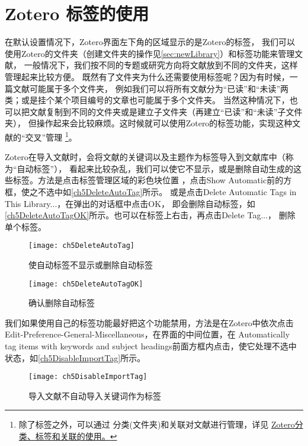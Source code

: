 \documentclass[cn,11pt,chinese]{elegantbook}
\begin{document}
	\section{Zotero 标签的使用} \label{sec:tag}
			在默认设置情况下，Zotero界面左下角的区域显示的是Zotero的标签，
			我们可以使用Zotero的文件夹（创建文件夹的操作见\cref{sec:newLibrary}）和标签功能来管理文献，
			一般情况下，我们按不同的专题或研究方向将文献放到不同的文件夹，这样管理起来比较方便。
			既然有了文件夹为什么还需要使用标签呢？因为有时候，一篇文献可能属于多个文件夹，
			例如我们可以将所有文献分为“已读”和“未读”两类；或是挂个某个项目编号的文章也可能属于多个文件夹。
			当然这种情况下，也可以把文献复制到不同的文件夹或是建立子文件夹（再建立“已读”和“未读”子文件夹），
			但操作起来会比较麻烦。这时候就可以使用Zotero的标签功能，实现这种文献的“交叉”管理
			\footnote{除了标签之外，可以通过
		分类(文件夹)和关联对文献进行管理，详见
		\href{https://zhuanlan.zhihu.com/p/275707703}{Zotero分类、标签和关联的使用。}}。
			
			Zotero在导入文献时，会将文献的关键词以及主题作为标签导入到文献库中（称为“自动标签”），
			看起来比较杂乱，我们可以使它不显示，或是删除自动生成的这些标签。方法是点击标签管理区域的彩色块位置
			，点击Show Automatic前的方框，使之不选中如\autoref{ch5DeleteAutoTag}所示。
			或是点击Delete Automatic Tags in This Library...，在弹出的对话框中点击OK，
			即会删除自动标签，如\autoref{ch5DeleteAutoTagOK}所示。也可以在标签上右击，再点击Delete Tag...，
			删除单个标签。
			
				\begin{figure}[htbp]
					\centering
					\texttt{[image: ch5DeleteAutoTag]}
					\caption{使自动标签不显示或删除自动标签}
					\label{ch5DeleteAutoTag}
				\end{figure}
				\begin{figure}[htbp]
					\centering
					\texttt{[image: ch5DeleteAutoTagOK]}
					\caption{确认删除自动标签}
					\label{ch5DeleteAutoTagOK}
				\end{figure}
			
			我们如果使用自己的标签功能最好把这个功能禁用，方法是在Zotero中依次点击Edit-Preference-General-Miscellaneous，在界面的中间位置，在
			Automatically tag items with keywords and subject headings前面方框内点击，使它处理不选中状态，如\autoref{ch5DisableImportTag}所示。
				\begin{figure}[htbp]
					\centering
					\texttt{[image: ch5DisableImportTag]}
					\caption{导入文献不自动导入关键词作为标签}
					\label{ch5DisableImportTag}
				\end{figure}
						
\end{document}
